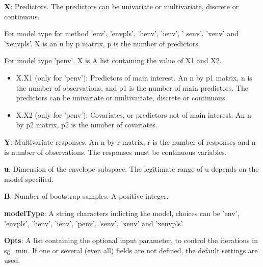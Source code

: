 \documentclass[a4paper,11pt,openany]{memoir}
\begin{document}
\begin{par}
\textbf{X}: Predictors.   The predictors can be univariate or multivariate, discrete or continuous.
\end{par} \vspace{1em}
\begin{par}
For model type for method 'env', 'envpls', 'henv', 'ienv', ' senv', 'xenv' and 'xenvpls'. X is an n by p matrix, p is the number of predictors.
\end{par} \vspace{1em}
\begin{par}
For model type 'penv', X is  A list containing the value of X1 and X2.
\end{par} \vspace{1em}
\begin{itemize}
\setlength{\itemsep}{-1ex}
   \item X.X1 (only for 'penv'): Predictors of main interest. An n by p1 matrix, n is the number of observations, and p1 is the number of main predictors. The predictors can be univariate or multivariate, discrete or continuous.
   \item X.X2 (only for 'penv'): Covariates, or predictors not of main interest.  An n by p2 matrix, p2 is the number of covariates.
\end{itemize}
\begin{par}
\textbf{Y}: Multivariate responses. An n by r matrix, r is the number of responses and n is number of observations. The responses must be continuous variables.
\end{par} \vspace{1em}
\begin{par}
\textbf{u}: Dimension of the envelope subspace. The legitimate range of u depends on the model specified.
\end{par} \vspace{1em}
\begin{par}
\textbf{B}: Number of bootstrap samples.  A positive integer.
\end{par} \vspace{1em}
\begin{par}
\textbf{modelType}: A string characters indicting the model, choices can be 'env', 'envpls', 'henv', 'ienv', 'penv', 'senv', 'xenv' and 'xenvpls'.
\end{par} \vspace{1em}
\begin{par}
\textbf{Opts}: A list containing the optional input parameter, to control the iterations in sg\_min. If one or several (even all) fields are not defined, the default settings are used.
\end{par} \vspace{1em}
\end{document}
